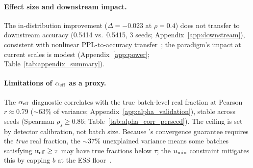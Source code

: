 \paragraph{Effect size and downstream impact.}
The in-distribution improvement ($\Delta{=}{-}0.023$ at $\rho{=}0.4$) does not transfer to downstream accuracy (0.5414 vs.\ 0.5415, 3 seeds; Appendix~\ref{app:downstream}), consistent with nonlinear PPL-to-accuracy transfer~\citep{tay2022scale,ye2025mixing}; the paradigm's impact at current scales is modest (Appendix~\ref{app:power}; Table~\ref{tab:appendix_summary}).

\paragraph{Limitations of $\alpha_{\mathrm{eff}}$ as a proxy.}
The $\alpha_{\mathrm{eff}}$ diagnostic correlates with the true batch-level real fraction at Pearson $r \approx 0.79$ (${\sim}$63\% of variance; Appendix~\ref{app:alpha_validation}), stable across seeds (Spearman $\rho_s \geq 0.86$; Table~\ref{tab:alpha_corr_perseed}).
The ceiling is set by detector calibration, not batch size.
Because \citet{wang2026survive}'s convergence guarantee requires the \emph{true} real fraction, the ${\sim}$37\% unexplained variance means some batches satisfying $\alpha_{\mathrm{eff}} \geq \tau$ may have true fractions below $\tau$; the $n_{\min}$ constraint mitigates this by capping $b$ at the ESS floor~\citep{owen2013mc}.
